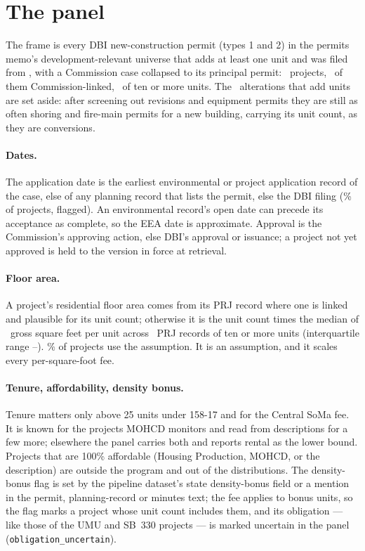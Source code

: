 \documentclass[11pt]{article}
\newcommand{\extable}[1]{\FloatBarrier\def\extab{#1}}
\begin{document}
\section{The panel}\label{sec:expanel}

The frame is every DBI new-construction permit (types 1 and 2) in the permits memo's
development-relevant universe that adds at least one unit and was filed from
, with a Commission case collapsed to its principal permit: \exProjects\
projects, \exLinked\ of them Commission-linked, \exBig\ of ten or more units. The
\exAlterations\ alterations that add units are set aside: after screening out revisions and
equipment permits they are still as often shoring and fire-main permits for a new building,
carrying its unit count, as they are conversions.

\extable{excoverage}

\paragraph{Dates.} The application date is the earliest environmental or project application
record of the case, else of any planning record that lists the permit, else the DBI filing
(\exDbiApp\% of projects, flagged). An environmental record's open date can precede its
acceptance as complete, so the EEA date is approximate. Approval is the Commission's approving
action, else DBI's approval or issuance; a project not yet approved is held to the version in
force at retrieval.

\paragraph{Floor area.} A project's residential floor area comes from its PRJ record where one
is linked and plausible for its unit count; otherwise it is the unit count times the median of
\exGpu\ gross square feet per unit across \exGpuN\ PRJ records of ten or more units
(interquartile range \exGpuLo--\exGpuHi). \exAssumedGfa\% of projects use the assumption. It is
an assumption, and it scales every per-square-foot fee.

\paragraph{Tenure, affordability, density bonus.} Tenure matters only above 25 units under
158-17 and for the Central SoMa fee. It is known for the projects MOHCD monitors and read from
descriptions for a few more; elsewhere the panel carries both and reports rental as the lower
bound. Projects that are 100\% affordable (Housing Production, MOHCD, or the description) are
outside the program and out of the distributions. The density-bonus flag is set by the pipeline
dataset's state density-bonus field or a mention in the permit, planning-record or minutes text;
the fee applies to bonus units, so the flag marks a project whose unit count includes them, and
its obligation --- like those of the UMU and SB~330 projects --- is marked uncertain in the panel
(\texttt{obligation\_uncertain}).
\end{document}
